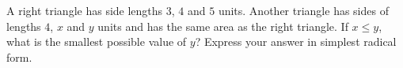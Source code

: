 A right triangle has side lengths $3$, $4$ and $5$ units. Another triangle has sides of lengths $4$, $x$ and $y$ units and has the same area as the right triangle. If $x\le y$, what is the smallest possible value of $y$? Express your answer in simplest radical form.
